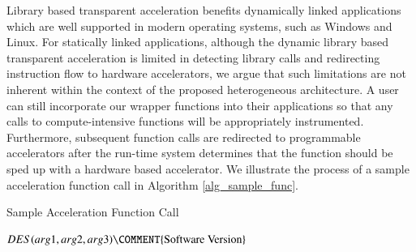 Library based transparent acceleration benefits dynamically
linked applications which are well supported in modern operating
systems, such as Windows and Linux. For statically linked applications,
although the dynamic library based transparent acceleration is limited
in detecting library calls and redirecting instruction flow to
hardware accelerators, we argue that such limitations are not inherent
within the context of the proposed heterogeneous architecture. A user can still
incorporate our wrapper functions into their applications so that any 
calls to compute-intensive functions will be appropriately instrumented.  Furthermore,
subsequent function calls are redirected to programmable accelerators after the
run-time system determines that the function should be sped
up with a hardware based accelerator.
We illustrate the process of a sample acceleration function call in Algorithm \ref{alg_sample_func}.

\begin{algorithm}[htb]
\scriptsize
\caption{Sample Acceleration Function Call}
\label{alg_sample_func}
\begin{algorithmic}[1]

		\ENDIF
		\ENDIF
	\ENDIF
		\ENDIF
		\ENDIF
	\ELSE
		\RETURN $DES(arg1, arg2, arg3) \COMMENT{\text{Software  Version}}$
	\ENDIF
\ENDIF

\end{algorithmic}

\end{algorithm}








